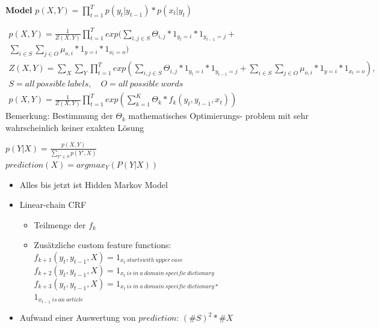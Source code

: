 \documentclass[12pt]{beamer}
\begin{document}
\begin{frame}
	\begin{center}
	\textbf{Model} $p(X,Y) = \prod_{t=1}^T p(y_t|y_{t-1}) * p(x_t|y_t)$
	\end{center}
	\begin{equation} \nonumber
		\begin{split}
			p(X,Y) = \frac{1}{Z(X,Y)}\prod_{t=1}^T exp(\sum_{i,j\in S}^{} \Theta_{i,j} * 1_{y_t=i} * 1_{y_{t-1}=j} + \\ \sum_{i \in S}^{} \sum_{j \in O}^{} \mu_{o,i} * 1_{y=i} * 1_{x_t=o}) 
			\\
			\scriptstyle Z(X,Y) = \sum_{X}^{}\sum_{Y}^{}\prod_{t=1}^T exp(\sum_{i,j\in S}^{} \Theta_{i,j} * 1_{y_t=i} * 1_{y_{t-1}=j} + \sum_{i \in S}^{} \sum_{j \in O}^{} \mu_{o,i} * 1_{y=i} * 1_{x_t=o}),
			\\
			\scriptstyle S = all\ possible\ labels, \quad O = all\ possible\ words
			\\
			p(X,Y) = \frac{1}{Z(X,Y)}\prod_{t=1}^T exp(\sum_{k=1}^{K} \Theta_{k} * f_k(y_t, y_{t-1}, x_t))
		\end{split}
	\end{equation}
	\small{Bemerkung: Bestimmung der $\Theta_{k}$ mathematisches Optimierungs- problem mit sehr wahrscheinlich keiner exakten Lösung}
\end{frame}

\begin{frame}
	\begin{center}
		$p(Y|X) = \frac{p(X,Y)}{\sum_{Y'\in S}^{}p(Y', X)}$ \\ \vspace{0.3cm}
		\boldmath$prediction(X) = argmax_Y(P(Y|X))$
	\end{center}
	\begin{itemize}
		\item Alles bis jetzt ist Hidden Markov Model
		\item Linear-chain CRF
		\begin{itemize}
			\item Teilmenge der $f_k$
			\item Zusätzliche custom feature functions: \\
			$f_{k+1}(y_t, y_{t-1}, X) = 1_{x_t\ starts with\ upper\ case}$ \\
			$f_{k+2}(y_t, y_{t-1}, X) = 1_{x_t\ is\ in\ a\ domain\ specific\ dictionary}$ \\
			$f_{k+3}(y_t, y_{t-1}, X) = 1_{x_t\ is\ in\ a\ domain\ specific\ dictionary *}$ \\ \hspace{3.1cm} $1_{x_{t-1}\ is\ an\ article}$
		\end{itemize}
		\item Aufwand einer Auswertung von $prediction$: $(\#S)^2*\#X$
	\end{itemize}
\end{frame}
\end{document}
